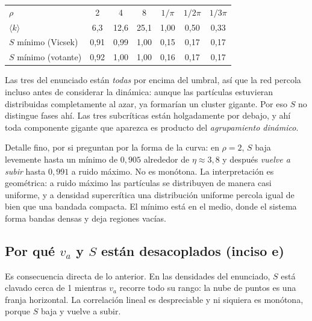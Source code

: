 \documentclass[11pt]{article}
\begin{document}
\begin{center}
\begin{tabular}{lccc|ccc}
\toprule
$\rho$ & 2 & 4 & 8 & $1/\pi$ & $1/2\pi$ & $1/3\pi$ \\
$\langle k \rangle$ & 6{,}3 & 12{,}6 & 25{,}1 & 1{,}00 & 0{,}50 & 0{,}33 \\
\midrule
$S$ mínimo (Vicsek) & 0{,}91 & 0{,}99 & 1{,}00 & 0{,}15 & 0{,}17 & 0{,}17 \\
$S$ mínimo (votante) & 0{,}92 & 1{,}00 & 1{,}00 & 0{,}16 & 0{,}17 & 0{,}17 \\
\bottomrule
\end{tabular}
\end{center}

Las tres del enunciado están \emph{todas} por encima del umbral, así que la red
percola incluso antes de considerar la dinámica: aunque las partículas
estuvieran distribuidas completamente al azar, ya formarían un cluster gigante.
Por eso $S$ no distingue fases ahí. Las tres subcríticas están holgadamente por
debajo, y ahí toda componente gigante que aparezca es producto del
\emph{agrupamiento dinámico}.


Detalle fino, por si preguntan por la forma de la curva: en $\rho = 2$, $S$ baja
levemente hasta un mínimo de $0{,}905$ alrededor de $\eta \approx 3{,}8$ y
después \emph{vuelve a subir} hasta $0{,}991$ a ruido máximo. No es monótona.
La interpretación es geométrica: a ruido máximo las partículas se distribuyen de
manera casi uniforme, y a densidad supercrítica una distribución uniforme
percola igual de bien que una bandada compacta. El mínimo está en el medio,
donde el sistema forma bandas densas y deja regiones vacías.

\subsection{Por qué $v_a$ y $S$ están desacoplados (inciso e)}

Es consecuencia directa de lo anterior. En las densidades del enunciado, $S$
está clavado cerca de 1 mientras $v_a$ recorre todo su rango: la nube de puntos
es una franja horizontal. La correlación lineal es despreciable y ni siquiera es
monótona, porque $S$ baja y vuelve a subir.
\end{document}
